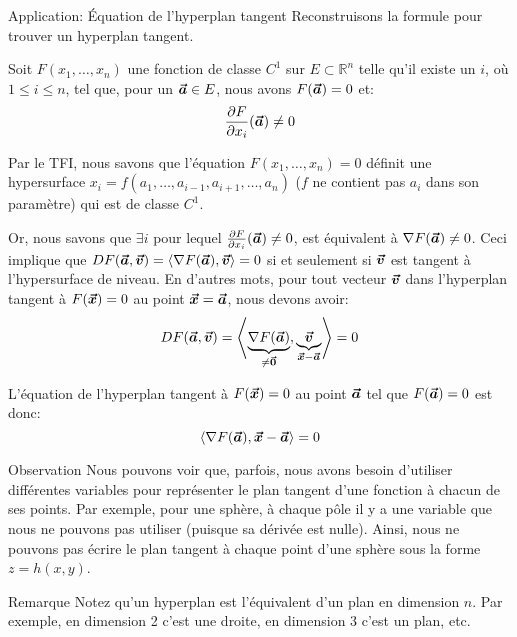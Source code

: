 \documentclass[a4paper]{article}
\begin{document}
\begin{parag}{Application: Équation de l'hyperplan tangent}
    Reconstruisons la formule pour trouver un hyperplan tangent. 

    Soit $F\left(x_1, \ldots, x_n\right)$ une fonction de classe $C^1$ sur $E \subset \mathbb{R}^n$ telle qu'il existe un $i$, où $1 \leq i \leq n$, tel que, pour un $\bm{\protect\vec{a}} \in E$, nous avons $F\left(\bvec{a}\right) = 0$ et:
    \[\frac{\partial F}{\partial x_i}\left(\bvec{a}\right) \neq 0\]

    Par le TFI, nous savons que l'équation $F\left(x_1, \ldots, x_n\right) = 0$ définit une hypersurface $x_i = f\left(a_1, \ldots, a_{i-1}, a_{i+1}, \ldots, a_n\right)$ ($f$ ne contient pas $a_i$ dans son paramètre) qui est de classe $C^1$.

    Or, nous savons que $\exists i$ pour lequel $\frac{\partial F}{\partial x_i}\left(\bvec{a}\right) \neq 0$, est équivalent à $\nabla F\left(\bvec{a}\right) \neq 0$. Ceci implique que $DF\left(\bvec{a}, \bvec{v}\right) = \left<\nabla F\left(\bvec{a}\right), \bvec{v}\right> = 0$ si et seulement si $\bm{\protect\vec{v}}$ est tangent à l'hypersurface de niveau. En d'autres mots, pour tout vecteur $\bm{\protect\vec{v}}$ dans l'hyperplan tangent à $F\left(\bvec{x}\right) = 0$ au point $\bm{\protect\vec{x}} = \bm{\protect\vec{a}}$, nous devons avoir:
    \[DF\left(\bvec{a}, \bvec{v}\right) = \left<\underbrace{\nabla F\left(\bvec{a}\right)}_{\neq \bvec{0}}, \underbrace{\bvec{v}}_{\bvec{x} - \bvec{a}}\right> = 0 \]

    L'équation de l'hyperplan tangent à $F\left(\bvec{x}\right) = 0$ au point $\bm{\protect\vec{a}}$ tel que $F\left(\bvec{a}\right) = 0$ est donc:
    \[\left<\nabla F\left(\bvec{a}\right), \bvec{x} - \bvec{a}\right> = 0\]

    \begin{subparag}{Observation}
        Nous pouvons voir que, parfois, nous avons besoin d'utiliser différentes variables pour représenter le plan tangent d'une fonction à chacun de ses points. Par exemple, pour une sphère, à chaque pôle il y a une variable que nous ne pouvons pas utiliser (puisque sa dérivée est nulle). Ainsi, nous ne pouvons pas écrire le plan tangent à chaque point d'une sphère sous la forme $z = h\left(x, y\right)$.
    \end{subparag}
    

    \begin{subparag}{Remarque}
        Notez qu'un hyperplan est l'équivalent d'un plan en dimension $n$. Par exemple, en dimension 2 c'est une droite, en dimension 3 c'est un plan, etc.
    \end{subparag}
\end{parag}
\end{document}

